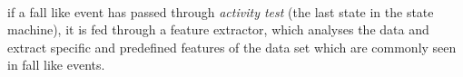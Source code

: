 \documentclass[12pt, a4paper, onecolumn]{article}
\begin{document}
		\paragraph{} if a fall like event has passed through \textit{activity test} (the last state in the state machine), it is fed through a feature extractor, which analyses the data and extract specific and predefined features of the data set which are commonly seen in fall like events. 

	
\newpage




\end{document}
